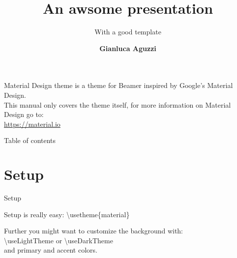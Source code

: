\documentclass[9pt, aspectratio=169]{beamer}
\begin{document}
\title{An awsome presentation}
\subtitle{With a good template}
\author[G.Aguzzi]{
  \textbf{Gianluca Aguzzi}
}

\begin{frame}[plain]
\titlepage
\end{frame}

\begin{frame}
\begin{card}
Material Design theme is a theme for Beamer inspired by Google's Material Design. \\[5mm]
This manual only covers the theme itself, for more information on Material Design go to: 
\\\url{https://material.io}
\end{card}
\end{frame}

\begin{frame}{Table of contents}
\begin{card}
\tableofcontents
\end{card}
\end{frame}

\section{Setup}
\begin{frame}{Setup}
\begin{card}
Setup is really easy: 
{\color{primary}\textbackslash usetheme\{material\}}
\end{card}
\begin{card}
Further you might want to customize the background with: \\[2mm]
{\color{primary}\textbackslash useLightTheme} or {\color{primary}\textbackslash useDarkTheme} \\[2mm]
and primary and accent colors.
\end{card}
\end{frame}
\end{document}
